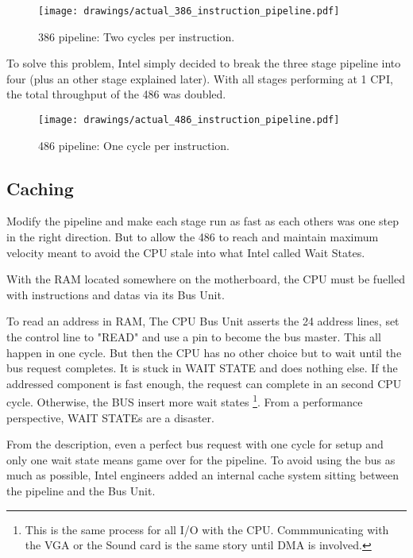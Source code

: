 \begin{figure}[H]
\centering
\texttt{[image: drawings/actual\_386\_instruction\_pipeline.pdf]}
\caption{386 pipeline: Two cycles per instruction.}
\end{figure}

\par
To solve this problem, Intel simply decided to break the three stage pipeline into four (plus an other stage explained later). With all stages performing at 1 CPI, the total throughput of the 486 was doubled.\\
\begin{figure}[H]
\centering
\texttt{[image: drawings/actual\_486\_instruction\_pipeline.pdf]}
\caption{486 pipeline: One cycle per instruction.}
\end{figure}
\par





\subsection{Caching }
Modify the pipeline and make each stage run as fast as each others was one step in the right direction. But to allow the 486 to reach and maintain maximum velocity meant to avoid the CPU stale into what Intel called Wait States.\\
\par
With the RAM located somewhere on the motherboard, the CPU must be fuelled with instructions and datas via its Bus Unit.\\
\par
{}
\par
To read an address in RAM, The CPU Bus Unit asserts the 24 address lines, set the control line to "READ" and use a pin to become the bus master. This all happen in one cycle. But then the CPU has no other choice but to wait until the bus request completes. It is stuck in WAIT STATE and does nothing else. If the addressed component is fast enough, the request can complete in an second CPU cycle. Otherwise, the BUS insert more wait states \footnote{This is the same process for all I/O with the CPU. Commmunicating with the VGA or the Sound card is the same story until DMA is involved.}. From a performance perspective, WAIT STATEs are a disaster.\\
\par
{}
From the description, even a perfect bus request with one cycle for setup and only one wait state means game over for the pipeline. To avoid using the bus as much as possible, Intel engineers added an internal cache system sitting between the pipeline and the Bus Unit.\\
\par
{}




